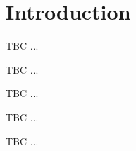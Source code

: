 %
%

\section{Introduction}

%
%

%
%

	TBC ... \cite{JunMXseries2012}

%
%

	TBC ... \cite{JunMXseries2012}

%
%

	TBC ... \cite{JunMXseries2012}

%
%

	TBC ... \cite{JunMXseries2012}

%
%

	TBC ... \cite{JunMXseries2012}
	
%
%